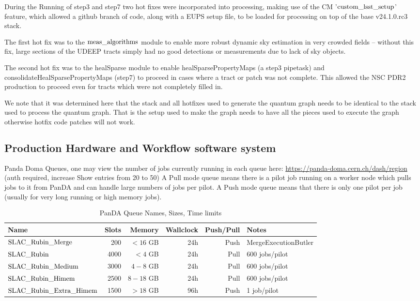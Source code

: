 During the Running of step3 and step7 two hot fixes were incorporated into processing, making use
of the CM '$\rm custom\_lsst\_setup$' feature, which allowed a github branch of code, along with a EUPS setup
file, to be loaded for processing on top of the base v24.1.0.rc3 stack.

The first hot fix was to the $\rm meas\_algorithms$ module to enable more robust dynamic sky estimation in very
crowded fields -- without this fix, large sections of the UDEEP tracts simply had no good detections or
measurements due to lack of sky objects.

The second hot fix was to the healSparse module to enable healSparsePropertyMaps (a step3 pipetask) and 
consolidateHealSparsePropertyMaps (step7) to proceed in cases where a tract or patch was not complete.
This allowed the NSC PDR2 production to proceed even for tracts which were not completely filled in.

We note that it was determined here that the stack and all hotfixes used to generate the quantum graph
needs to be identical to the stack used to process the quantum graph.  That is the setup used to make the graph
needs to have all the pieces used to execute the graph otherwise hotfix code patches will not work.

\subsection{Production Hardware and Workflow software system}

Panda Doma Queues, one may view the number of jobs currently running in each queue here:
\url{https://panda-doma.cern.ch/dash/region} (auth required, increase Show entries from 20 to 50)
A Pull mode queue means there is a pilot job running on a worker node which pulls jobs to it from PanDA and
can handle large numbers of jobs per pilot.  A Push mode queue means that there is only one pilot per
job (usually for very long running or high memory jobs). 

\normalsize 
\begin{center}
\begin{longtable}{|l|r|r|r|r|l|} 
\caption{PanDA Queue Names, Sizes, Time limits} \label{tab:pandaqueues}\\
\hline 
\textbf{Name}&\textbf{Slots}&\textbf{Memory}&\textbf{Wallclock}&\textbf{Push/Pull}&\textbf{Notes} \\ 
\hline
$\rm SLAC\_Rubin\_Merge$ & 200 & $<16$ GB & 24h & Push & MergeExecutionButler \\
$\rm SLAC\_Rubin$ & 4000 & $<4$ GB & 24h & Pull & 600 jobs/pilot \\
$\rm SLAC\_Rubin\_Medium$ & 3000 & $4-8$ GB & 24h & Pull &  600 jobs/pilot\\
$\rm SLAC\_Rubin\_Himem$ & 2500& $8-18$ GB & 24h & Pull &  600 jobs/pilot \\
$\rm SLAC\_Rubin\_Extra\_Himem$ & 1500 & $>18$ GB & 96h & Push & 1 job/pilot \\
\hline
\end{longtable} 
\end{center}
\normalsize

